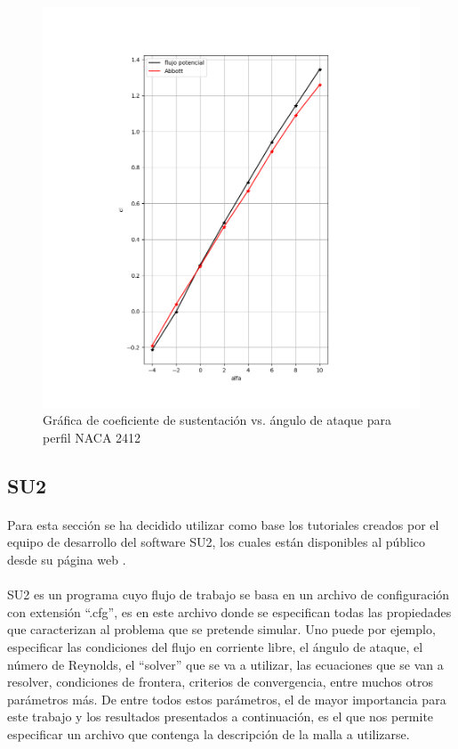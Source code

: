 \documentclass[letterpaper, openright, 12pt]{book}
\begin{document}
    \begin{figure}[H]%
        \centering
        \includegraphics[keepaspectratio,
            width=138mm]{./Imagenes/potential_flow_2412_cl}
        \caption{Gráfica de coeficiente de sustentación vs. ángulo de ataque para
            perfil NACA 2412}
        \label{fig:potential_flow_2412_cl}
    \end{figure}

    \subsection{SU2}
    \paragraph*{}
    Para esta sección se ha decidido utilizar como base los tutoriales creados
    por el equipo de desarrollo del software SU2, los cuales están disponibles
    al público desde su página web \cite{SU2}.

    \paragraph*{}
    SU2 es un programa cuyo flujo de trabajo se basa en un archivo de
    configuración con extensión ``.cfg'', es en este archivo donde se
    especifican todas las propiedades que caracterizan al problema que se
    pretende simular. Uno puede por ejemplo, especificar las condiciones del
    flujo en corriente libre, el ángulo de ataque, el número de Reynolds, el
    ``solver'' que se va a utilizar, las ecuaciones que se van a resolver,
    condiciones de frontera, criterios de convergencia, entre muchos otros
    parámetros más. De entre todos estos parámetros, el de mayor importancia
    para este trabajo y los resultados presentados a continuación, es el que nos
    permite especificar un archivo que contenga la descripción de la malla a
    utilizarse.
\end{document}
